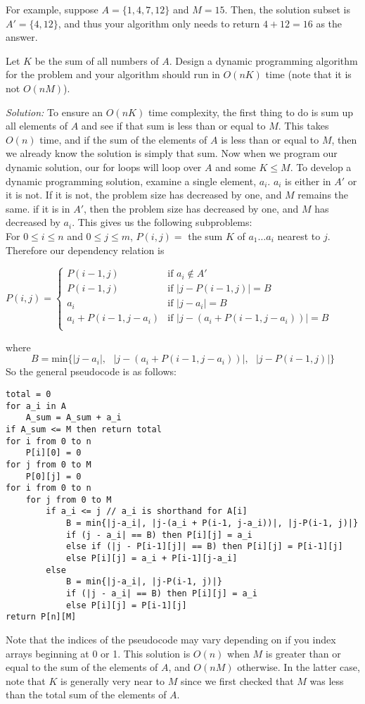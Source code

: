 \documentclass[11pt]{article}
\begin{document}
\begin{enumerate}
For example, suppose $A=\{1,4,7,12\}$ and $M=15$. Then, the solution subset is $A'=\{4,12\}$, and thus your algorithm only needs to return $4+12=16$ as the answer.

Let $K$ be the sum of all numbers of $A$.
Design a dynamic programming algorithm for the problem and your
algorithm should run in $O(nK)$ time (note that it is not $O(nM)$).

\textit{Solution:} To ensure an $O(nK)$ time complexity, the first thing to do is sum up all elements of $A$ and see if that sum is less than or equal to $M$. This takes $O(n)$ time, and if the sum of the elements of $A$ is less than or equal to $M$, then we already know the solution is simply that sum. Now when we program our dynamic solution, our for loops will loop over $A$ and some $K \leq M$. To develop a dynamic programming solution, examine a single element, $a_i$. $a_i$ is either in $A'$ or it is not. If it is not, the problem size has decreased by one, and $M$ remains the same. if it is in $A'$, then the problem size has decreased by one, and $M$ has decreased by $a_i$. This gives us the following subproblems: \\
For $0 \leq i \leq n$ and $0 \leq j \leq m$, $P(i,j)=$ the sum $K$ of $a_1\ldots a_i$ nearest to $j$. Therefore our dependency relation is
\begin{flushleft}
$P(i, j) = 
\begin{cases} 
P(i-1, j) & \mbox{if } a_i \notin A' \\ 
P(i-1, j) & \mbox{if } |j-P(i-1, j)| = B \\
a_i & \mbox{if } |j-a_i| = B \\
a_i + P(i-1, j-a_i) & \mbox{if } |j-(a_i + P(i-1, j-a_i))| = B\\
\end{cases}$
\end{flushleft}
where \[B =  \mbox{min\{} |j-a_i|, \mbox{ } |j-(a_i + P(i-1, j-a_i))|, \mbox{ } |j-P(i-1, j)| \mbox{\}}\]
So the general pseudocode is as follows:
\begin{verbatim}
total = 0
for a_i in A
    A_sum = A_sum + a_i
if A_sum <= M then return total
for i from 0 to n
    P[i][0] = 0
for j from 0 to M
    P[0][j] = 0
for i from 0 to n
    for j from 0 to M
        if a_i <= j // a_i is shorthand for A[i]
            B = min{|j-a_i|, |j-(a_i + P(i-1, j-a_i))|, |j-P(i-1, j)|}
            if (j - a_i| == B) then P[i][j] = a_i
            else if (|j - P[i-1][j]| == B) then P[i][j] = P[i-1][j]
            else P[i][j] = a_i + P[i-1][j-a_i]
        else
            B = min{|j-a_i|, |j-P(i-1, j)|}
            if (|j - a_i| == B) then P[i][j] = a_i
            else P[i][j] = P[i-1][j]
return P[n][M]
\end{verbatim}
Note that the indices of the pseudocode may vary depending on if you index arrays beginning at 0 or 1. This solution is $O(n)$ when $M$ is greater than or equal to the sum of the elements of $A$, and $O(nM)$ otherwise. In the latter case, note that $K$ is generally very near to $M$ since we first checked that $M$ was less than the total sum of the elements of $A$.


\end{enumerate}
\end{document}
